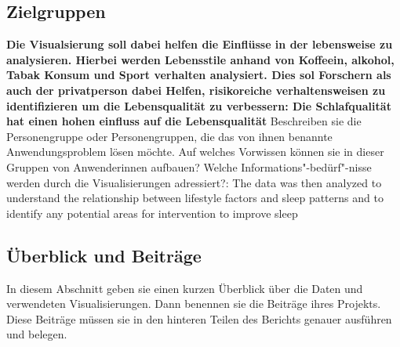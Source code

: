 \documentclass[usegeometry=true]{scrartcl}
\begin{document}
\subsection{Zielgruppen}
\textbf {Die Visualsierung soll dabei helfen die Einflüsse in der lebensweise zu analysieren. Hierbei werden Lebensstile anhand von Koffeein, alkohol, Tabak Konsum und Sport verhalten analysiert. Dies sol Forschern als auch der privatperson dabei Helfen, risikoreiche verhaltensweisen zu identifizieren um die Lebensqualität zu verbessern: Die Schlafqualität hat einen hohen einfluss auf die Lebensqualität }
Beschreiben sie die Personengruppe oder Personengruppen, die das von ihnen benannte Anwendungsproblem lösen möchte. Auf welches Vorwissen können sie in dieser Gruppen von Anwenderinnen aufbauen? Welche Informations"-bedürf"-nisse werden durch die Visualisierungen adressiert?: The data was then analyzed to understand the relationship between lifestyle factors and sleep patterns and to identify any potential areas for intervention to improve sleep
\subsection{Überblick und Beiträge}
In diesem Abschnitt geben sie einen kurzen Überblick über die Daten und verwendeten Visualisierungen. Dann benennen sie die Beiträge ihres Projekts. Diese Beiträge müssen sie in den hinteren Teilen des Berichts genauer ausführen und belegen.
\end{document}
